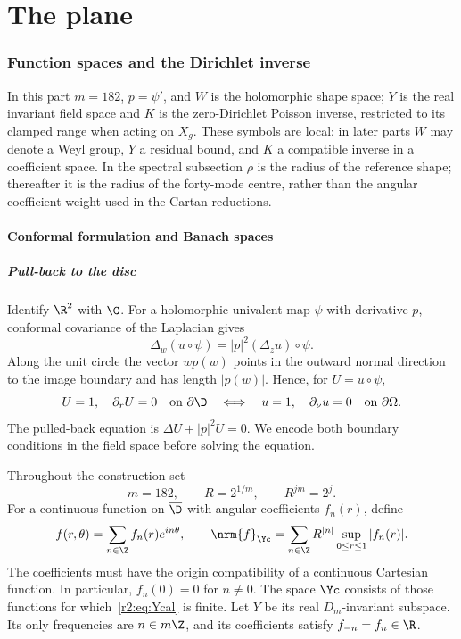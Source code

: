 \part{The plane}\label{r2:part}
\section{Function spaces and the Dirichlet inverse}\label{r2:sec:inverse}
In this part $m=182$, $p=\psi'$, and $W$ is the holomorphic shape space; $Y$ is the real invariant field space and $K$ is the zero-Dirichlet Poisson inverse, restricted to its clamped range when acting on $X_g$. These symbols are local: in later parts $W$ may denote a Weyl group, $Y$ a residual bound, and $K$ a compatible inverse in a coefficient space. In the spectral subsection $\rho$ is the radius of the reference shape; thereafter it is the radius of the forty-mode centre, rather than the angular coefficient weight used in the Cartan reductions.

\subsection{Conformal formulation and Banach spaces}\label{r2:sec:spaces}

\subsubsection{Pull-back to the disc}
Identify $\R^2$ with $\C$. For a holomorphic univalent map $\psi$ with derivative $p$, conformal covariance of the Laplacian gives
\begin{equation}\label{r2:eq:covariance}
 \Delta_w(u\circ\psi)=|p|^2(\Delta_z u)\circ\psi.
\end{equation}
Along the unit circle the vector $w p(w)$ points in the outward normal direction to the image boundary and has length $|p(w)|$. Hence, for $U=u\circ\psi$,
\[
 U=1,\quad\partial_rU=0\quad\text{on }\partial\D
 \quad\Longleftrightarrow\quad
 u=1,\quad\partial_\nu u=0\quad\text{on }\partial\Omega.
\]
The pulled-back equation is $\Delta U+|p|^2U=0$. We encode both boundary conditions in the field space before solving the equation.

Throughout the construction set
\begin{equation}\label{r2:eq:weight}
 m=182,\qquad R=2^{1/m},\qquad R^{jm}=2^j.
\end{equation}
For a continuous function on $\overline\D$ with angular coefficients $f_n(r)$, define
\begin{equation}\label{r2:eq:Ycal}
 f(r,\theta)=\sum_{n\in\Z}f_n(r)e^{in\theta},\qquad
 \nrm{f}_{\Yc}=\sum_{n\in\Z}R^{|n|}\sup_{0\le r\le1}|f_n(r)|.
\end{equation}
The coefficients must have the origin compatibility of a continuous Cartesian function. In particular, $f_n(0)=0$ for $n\ne0$. The space $\Yc$ consists of those functions for which~\eqref{r2:eq:Ycal} is finite. Let $Y$ be its real $D_m$-invariant subspace. Its only frequencies are $n\in m\Z$, and its coefficients satisfy $f_{-n}=f_n\in\R$.


